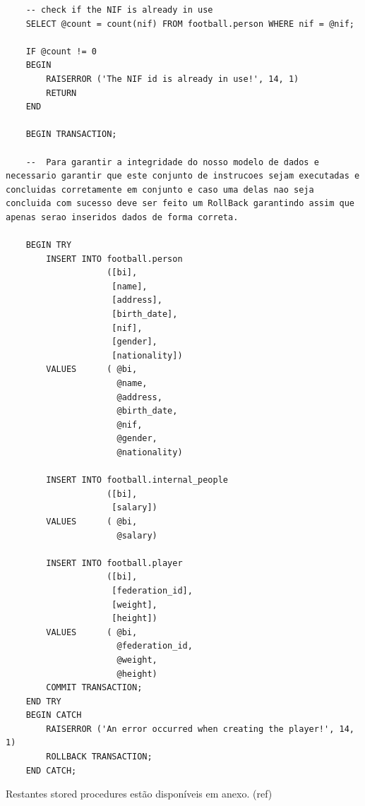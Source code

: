 \documentclass[pdftex,12pt,a4paper]{report}
\begin{document}
\begin{lstlisting}
	-- check if the NIF is already in use
	SELECT @count = count(nif) FROM football.person WHERE nif = @nif;

	IF @count != 0
	BEGIN
		RAISERROR ('The NIF id is already in use!', 14, 1)
		RETURN
	END

	BEGIN TRANSACTION;
	
	--  Para garantir a integridade do nosso modelo de dados e necessario garantir que este conjunto de instrucoes sejam executadas e concluidas corretamente em conjunto e caso uma delas nao seja concluida com sucesso deve ser feito um RollBack garantindo assim que apenas serao inseridos dados de forma correta.
	
	BEGIN TRY
		INSERT INTO football.person 
					([bi], 
					 [name], 
					 [address], 
					 [birth_date], 
					 [nif], 
					 [gender],
					 [nationality]) 
		VALUES      ( @bi, 
					  @name, 
					  @address, 
					  @birth_date, 
					  @nif, 
					  @gender,
					  @nationality) 

		INSERT INTO football.internal_people 
					([bi], 
					 [salary]) 
		VALUES      ( @bi, 
					  @salary) 

		INSERT INTO football.player 
					([bi], 
					 [federation_id], 
					 [weight],
					 [height]) 
		VALUES      ( @bi, 
					  @federation_id, 
					  @weight,
					  @height)
		COMMIT TRANSACTION;
	END TRY
	BEGIN CATCH
		RAISERROR ('An error occurred when creating the player!', 14, 1)
		ROLLBACK TRANSACTION;
	END CATCH;

\end{lstlisting}
 \vspace{0,5in}

Restantes stored procedures estão disponíveis em anexo. (ref)
\end{document}

